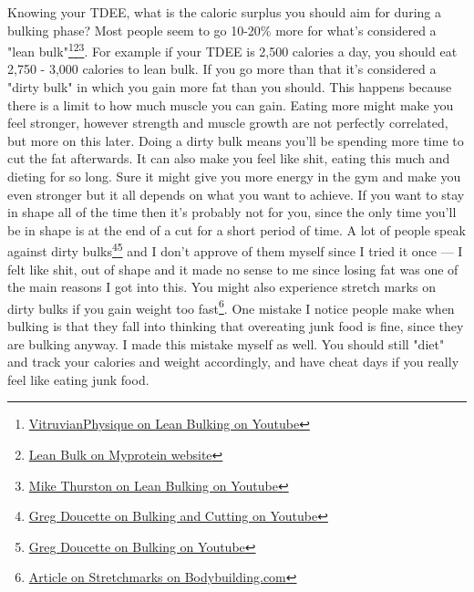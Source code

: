 \documentclass[openany, 12pt]{book}
\begin{document}
	Knowing your TDEE, what is the caloric surplus you should aim for during a bulking phase? Most people seem to go 10-20\% more for what's considered a
        "lean bulk"\footnote{\href{https://www.youtube.com/watch?v=rCdba0UPTMk}{VitruvianPhysique on Lean Bulking on Youtube}}\footnote{\href{https://us.myprotein.com/thezone/nutrition/the-lean-bulk-how-to-minimize-fat-gain-while-bulking/}{Lean Bulk on Myprotein website}}\footnote{\href{https://www.youtube.com/watch?v=Ci3qXtNFU_w}{Mike Thurston on Lean Bulking on Youtube}}.
        For example if your TDEE is 2,500 calories a day, you should eat 2,750 - 3,000 calories to lean bulk. If you go more than that it's considered a "dirty bulk" in which you gain more fat than
        you should. This happens because there is a limit to how much muscle you can gain. Eating more might make you feel stronger, however strength and muscle growth are not perfectly correlated,
        but more on this later. Doing a dirty bulk means you'll be spending more time to cut the fat afterwards. It can also make you feel like shit, eating this much and dieting for so long.
        Sure it might give you more energy in the gym and make you even stronger but it all depends on what you want to achieve. If you want to stay in shape all of the time then it's probably not for you, since the only time you'll be in shape is at the end of a cut for a short period of time. A lot of people speak against dirty bulks\footnote{\href{https://www.youtube.com/watch?v=DjEnkzhz5T4}{Greg Doucette on Bulking and Cutting on Youtube}}\footnote{\href{https://www.youtube.com/watch?v=xl0ZNFcvuJI}{Greg Doucette on Bulking on Youtube}} and I don't approve of them myself since I tried it once --- I felt like shit, out of shape and it made no sense to me since losing fat was one of the main reasons I got into this. You might also experience stretch marks on dirty bulks if you gain weight too fast\footnote{\href{https://www.bodybuilding.com/content/stretchmark-maintenance.html}{Article on Stretchmarks on Bodybuilding.com}}. One mistake I notice people make when bulking is that they fall into thinking that overeating junk food is fine, since they are bulking anyway. I made this mistake myself as well. You should still "diet" and track your calories and weight accordingly, and have cheat days if you really feel like eating junk food. %
	
\end{document}
